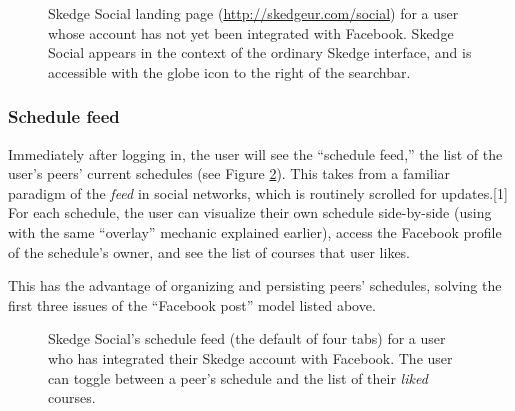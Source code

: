   \begin{figure}[H]
      \centering
      \caption{Skedge Social landing page (\url{http://skedgeur.com/social}) for a user whose account has not yet been integrated with Facebook. Skedge Social appears in the context of the ordinary Skedge interface, and is accessible with the globe icon to the right of the searchbar.} \label{fig:sk-social-login}
    \end{figure}

  \subsubsection{Schedule feed}

  Immediately after logging in, the user will see the ``schedule feed,'' the list of the user's peers' current schedules (see Figure \ref{fig:sk-feed}). This takes from a familiar paradigm of the \emph{feed} in social networks, which is routinely scrolled for updates.[1] For each schedule, the user can visualize their own schedule side-by-side (using with the same ``overlay'' mechanic explained earlier), access the Facebook profile of the schedule's owner, and see the list of courses that user likes.

  This has the advantage of organizing and persisting peers' schedules, solving the first three issues of the ``Facebook post'' model listed above.
      
    \begin{figure}
      \centering
      \caption{Skedge Social's schedule feed (the default of four tabs) for a user who has integrated their Skedge account with Facebook. The user can toggle between a peer's schedule and the list of their \emph{liked} courses.} \label{fig:sk-feed}
    \end{figure}
  
